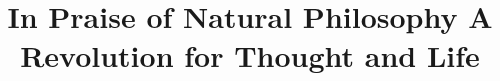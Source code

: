 \documentclass{article}
\begin{document}
\title{In Praise of Natural Philosophy A Revolution for Thought and Life}
\end{document}
